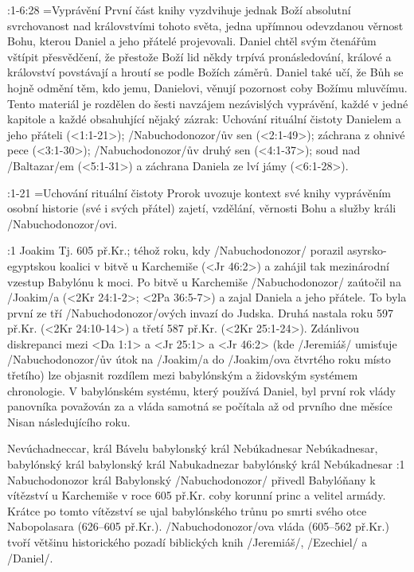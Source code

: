 
:1-6:28 {}={Vyprávění}  První část knihy vyzdvihuje jednak Boží absolutní svrchovanost nad královstvími tohoto světa, jedna upřímnou odevzdanou věrnost Bohu, kterou Daniel a jeho přátelé projevovali.
Daniel chtěl svým čtenářům vštípit přesvědčení, že přestože Boží lid někdy trpívá pronásledování, králové a království povstávají a hroutí se podle Božích záměrů. Daniel také učí, že Bůh se hojně odmění těm, kdo jemu, Danielovi, věnují pozornost coby Božímu mluvčímu. Tento materiál je rozdělen do šesti navzájem nezávislých vyprávění, každé v jedné kapitole a každé obsahuhjící nějaký zázrak:
Uchování rituální čistoty Danielem a jeho přáteli (<1:1-21>); \x/Nabuchodonozor/ův sen (<2:1-49>); záchrana z ohnivé pece (<3:1-30>); \x/Nabuchodonozor/ův druhý sen (<4:1-37>); soud nad \x/Baltazar/em (<5:1-31>) a záchrana Daniela ze lví jámy (<6:1-28>).

:1-21 {}={Uchování rituální čistoty}  Prorok uvozuje kontext své knihy vyprávěním osobní historie (své i svých přátel) zajetí, vzdělání, věrnosti Bohu a služby králi \x/Nabuchodonozor/ovi.

:1 {Joakim}  Tj. 605 př.Kr.; téhož roku, kdy \x/Nabuchodonozor/ porazil  asyrsko-egyptskou koalici v bitvě u Karchemiše (<Jr 46:2>) a zahájil tak mezinárodní vzestup Babylónu k moci. Po bitvě u Karchemiše \x/Nabuchodonozor/ zaútočil na \x/Joakim/a (<2Kr 24:1-2>; <2Pa 36:5-7>) a zajal Daniela a jeho přátele. 
To byla první ze tří \x/Nabuchodonozor/ových  invazí do Judska. Druhá nastala roku 597 př.Kr. (<2Kr 24:10-14>) a třetí 587 př.Kr. (<2Kr 25:1-24>). Zdánlivou diskrepanci mezi <Da 1:1> a <Jr 25:1> a <Jr 46:2> (kde \x/Jeremiáš/ umisťuje \x/Nabuchodonozor/ův útok na \x/Joakim/a do \x/Joakim/ova čtvrtého roku místo třetího) lze objasnit rozdílem mezi babylónským a židovským systémem chronologie. V babylónském systému, který používá Daniel, byl první rok vlády panovníka považován za  a vláda samotná se počítala až od prvního dne měsíce Nisan následujícího roku.

    {Nevúchadneccar, král Bávelu} %
    {babylonský král Nebúkadnesar}  %
    {Nebúkadnesar, babylónský král} %
    {babylonský král Nabukadnezar}  %
    {babylónský král Nebúkadnesar}  %
:1 {Nabuchodonozor král Babylonský}  \x/Nabuchodonozor/ přivedl Babylóňany k vítězství u Karchemiše v roce 605 př.Kr. coby korunní princ a velitel armády. Krátce po tomto vítězství se ujal babylónského trůnu po smrti svého otce Nabopolasara (626--605 př.Kr.). \x/Nabuchodonozor/ova vláda (605--562 př.Kr.) tvoří většinu historického pozadí  biblických knih \x/Jeremiáš/, \x/Ezechiel/ a \x/Daniel/.     

